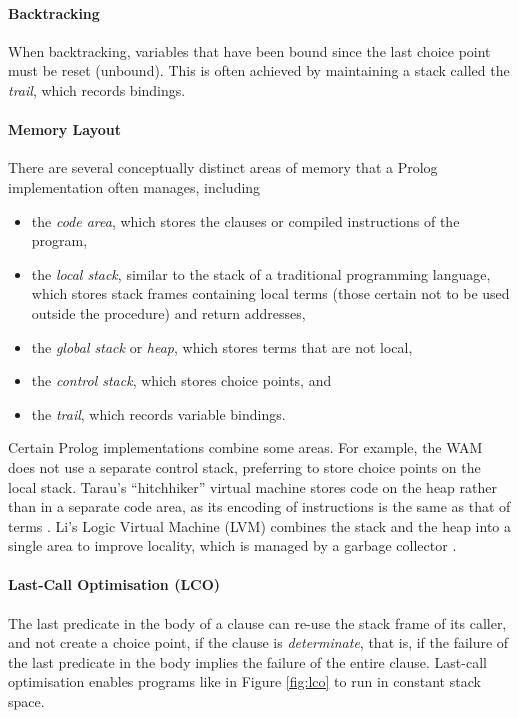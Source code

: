\paragraph{Backtracking} When backtracking, variables that have been bound since the last choice point must be reset (unbound). This is often achieved by maintaining a stack called the \emph{trail}, which records bindings.

\paragraph{Memory Layout} There are several conceptually distinct areas of memory that a Prolog implementation often manages, including

\begin{itemize}
\item the \emph{code area}, which stores the clauses or compiled instructions of the program,
\item the \emph{local stack}, similar to the stack of a traditional programming language, which stores stack frames containing local terms (those certain not to be used outside the procedure) and return addresses,
\item the \emph{global stack} or \emph{heap}, which stores terms that are not local,
\item the \emph{control stack}, which stores choice points, and
\item the \emph{trail}, which records variable bindings.
\end{itemize}

Certain Prolog implementations combine some areas. For example, the WAM does not use a separate control stack, preferring to store choice points on the local stack. Tarau's ``hitchhiker'' virtual machine stores code on the heap rather than in a separate code area, as its encoding of instructions is the same as that of terms \cite{tarauHitchhikersGuideReinventing2018}. Li's Logic Virtual Machine (LVM) combines the stack and the heap into a single area to improve locality, which is managed by a garbage collector \cite{liEfficientMemoryManagement2000}.

\paragraph{Last-Call Optimisation (LCO)} The last predicate in the body of a clause can re-use the stack frame of its caller, and not create a choice point, if the clause is \emph{determinate}, that is, if the failure of the last predicate in the body implies the failure of the entire clause. Last-call optimisation enables programs like in Figure \ref{fig:lco} to run in constant stack space.


